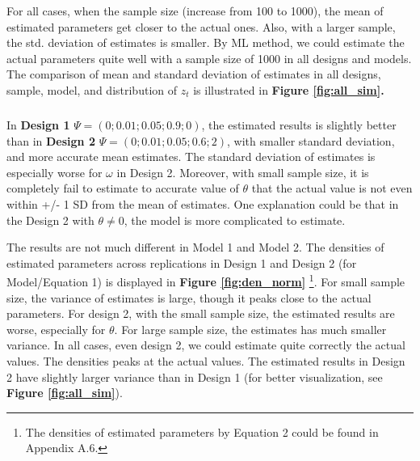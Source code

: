 \documentclass[a4paper]{article}
\begin{document}
For all cases, when the sample size (increase from 100 to 1000), the mean of estimated parameters get closer to the actual ones. Also, with a larger sample, the std. deviation of estimates is smaller. By ML method, we could estimate the actual parameters quite well with a sample size of 1000 in all designs and models.
The comparison of mean and standard deviation of estimates in all designs, sample, model, and distribution of $z_t$ is illustrated in \textbf{Figure \ref{fig:all_sim}.}

\subparagraph*{}
In \textbf{Design 1} $\Psi = (0; 0.01; 0.05; 0.9; 0)$, the estimated results is slightly better than in \textbf{Design 2} $\Psi = (0; 0.01; 0.05; 0.6; 2)$, with smaller standard deviation, and more accurate mean estimates. The standard deviation of estimates is especially worse for $\omega$ in Design 2. Moreover, with small sample size, it is completely fail to estimate to accurate value of $\theta$ that the actual value is not even within +/- 1 SD from the mean of estimates. One explanation could be that in the Design 2  with $\theta \neq 0$, the model is more complicated to estimate. 

The results are not much different in Model 1 and Model 2. The densities of estimated parameters across replications in Design 1 and Design 2 (for Model/Equation 1) is displayed in \textbf{Figure \ref{fig:den_norm}} \footnote{The densities of estimated parameters by Equation 2 could be found in Appendix A.6.}. For small sample size, the variance of estimates is large, though it peaks close to the actual parameters. For design 2, with the small sample size, the estimated results are worse, especially for $\theta$. For large sample size, the estimates has much smaller variance. In all cases, even design 2, we could estimate quite correctly the actual values. The densities peaks at the actual values. The estimated results in Design 2 have slightly larger variance than in Design 1 (for better visualization, see \textbf{Figure \ref{fig:all_sim}}).
\end{document}
